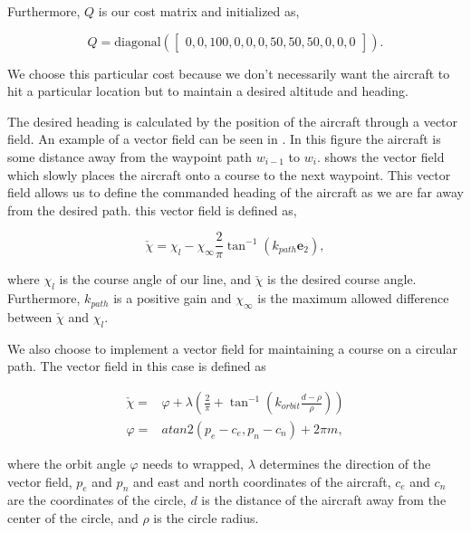 \documentclass[letterpaper, 10 pt, conference]{ieeeconf}  %
\begin{document}
Furthermore, $Q$ is our cost matrix and initialized as,

\begin{equation}
Q = \text{diagonal}(\begin{bmatrix}
0,0,100,0,0,0,50,50,50,0,0,0
\end{bmatrix}).
\end{equation}

We choose this particular cost because we don't necessarily want the aircraft to hit a particular location but to maintain a desired altitude and heading. 

The desired heading is calculated by the position of the aircraft through a vector field. An example of a vector field can be seen in . In this figure the aircraft is some distance away from the waypoint path $w_{i-1}$ to $w_i$.  shows the vector field which slowly places the aircraft onto a course to the next waypoint. This vector field allows us to define the commanded heading of the aircraft as we are far away from the desired path. this vector field is defined as,

\begin{equation}
\check{\chi}=\chi_{l}-\chi_{\infty}\frac{2}{\pi}\tan^{-1}\left(k_{path}\mathbf{e}_{2}\right),
\end{equation}

where $\chi_l$ is the course angle of our line, and $\check{\chi}$ is the desired course angle. Furthermore, $k_{path}$ is a positive gain and $\chi_\infty$ is the maximum allowed difference between $\check{\chi}$ and $\chi_l$.

We also choose to implement a vector field for maintaining a course on a circular path. The vector field in this case is defined as 


\begin{equation}
\begin{aligned}
\check{\chi}= & \varphi +  \lambda \left(\frac{2}{\pi}+\tan^{-1}\left(k_{orbit}\frac{d-\rho}{\rho}\right)\right) \\
\varphi = & atan2\left(p_e-c_e,p_n-c_n\right)+2\pi m,
\end{aligned}
\end{equation}

where the orbit angle $\varphi$ needs to wrapped, $\lambda$ determines the direction of the vector field, $p_e$ and $p_n$ and east and north coordinates of the aircraft, $c_e$ and $c_n$ are the coordinates of the circle, $d$ is the distance of the aircraft away from the center of the circle, and $\rho$ is the circle radius.
\end{document}
